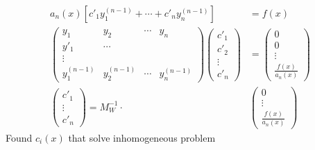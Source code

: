 \documentclass[Maths.tex]{subfiles}
\begin{document}
\begin{align}
    a_n(x)\left[c'_1y_1^{(n-1)} + \cdots + c'_ny_n^{(n-1)}\right] &= f(x) \\
    \begin{pmatrix} y_1 & y_2 & \cdots & y_n \\ y'_1 & \cdots & & \\ \vdots & & & \\ y_1^{(n-1)} & y_2^{(n-1)} & \cdots & y_n^{(n-1)}\end{pmatrix} \begin{pmatrix} c'_1 \\ c'_2 \\ \vdots \\ c'_n \end{pmatrix} &= \begin{pmatrix} 0 \\ 0 \\ \vdots \\ \frac{f(x)}{a_n(x)} \end{pmatrix} \\
    \begin{pmatrix} c'_1 \\ \vdots \\ c'_n \end{pmatrix} = M_W^{-1} \cdot& \begin{pmatrix} 0 \\ \vdots \\ \frac{f(x)}{a_n(x)} \end{pmatrix}
\end{align}
Found $c_i(x)$ that solve inhomogeneous problem
\end{document}
